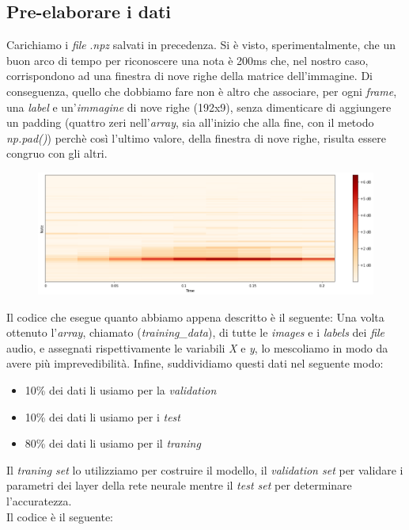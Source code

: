 \subsection{Pre-elaborare i dati}
Carichiamo i \textit{file} .\textit{npz} salvati in precedenza. Si è visto, sperimentalmente, che un buon arco di tempo per riconoscere una nota è 200ms che, nel nostro caso, corrispondono ad una finestra di nove righe della matrice dell'immagine. Di conseguenza, quello che dobbiamo fare non è altro che associare, per ogni \textit{frame}, una \textit{label} e un'\textit{immagine} di nove righe (192x9), senza dimenticare di aggiungere un padding (quattro zeri nell'\textit{array}, sia all'inizio che alla fine, con il metodo \textit{np.pad()}) perchè così l'ultimo valore, della finestra di nove righe, risulta essere congruo con gli altri.\\
\newline
\begin{figure}[H]
	\centering
	\includegraphics[scale=0.50]{./images/img8.png}
\end{figure}
Il codice che esegue quanto abbiamo appena descritto è il seguente:
\vspace*{2ex}
\vspace*{2ex}
Una volta ottenuto l'\textit{array}, chiamato (\textit{training\_data}), di tutte le \textit{images} e i \textit{labels} dei \textit{file} audio, e assegnati rispettivamente le variabili \textit{X} e \textit{y}, lo mescoliamo in modo da avere più imprevedibilità. Infine, suddividiamo questi dati nel seguente modo:
\begin{itemize}
	\item 10\% dei dati li usiamo per la \textit{validation}
	\item 10\% dei dati li usiamo per i \textit{test}
	\item 80\% dei dati li usiamo per il \textit{traning}
\end{itemize}
Il \textit{traning set} lo utilizziamo per costruire il modello, il \textit{validation set} per validare i parametri dei layer della rete neurale mentre il \textit{test set} per determinare l'accuratezza.\\
\newline
Il codice è il seguente:
\vspace*{2ex}
\vspace*{2ex}
